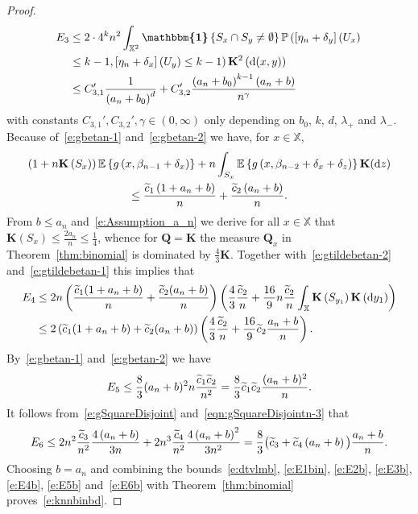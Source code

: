 \documentclass[AHL,Unicode,longabstracts]{cedram}
\newcommand*\bK{\mathbf{K}}
\newcommand{\bQ}{\mathbf{Q}}
\renewcommand*\P{\mathbb{P}}
\newcommand*\X{\mathbb{X}}
\newcommand{\E}{\mathbb{E}}
\newcommand*\md{\mathrm{d}}
\newcommand{\mean}[1] {\E\left\{{#1}\right\}}
\newcommand{\ind}{\boldsymbol{\mathbbm{1}}}
\let\oldtilde\tilde
\renewcommand*{\tilde}[1]{\mathchoice{\widetilde{#1}}{\widetilde{#1}}{\oldtilde{#1}}{\oldtilde{#1}}}
\begin{document}
\begin{proof}
\begin{equation}\label{e:E3b}
\begin{split}
E_3 &\leq 2\cdot 4^k n^2 \int_{\X^2} \ind\left
\{S_{x}\cap S_{y} \neq \emptyset\right\} \P\left(\left[\eta_{n}+\delta_y\right]\left(U_{x}\right)\right. \\
&\left.\leq k-1, \left[\eta_{n}+\delta_x\right]\left(U_{y}\right)\leq k-1\right) \bK^2\left(\md(x,y)\right)\\
&\leq C_{3,1}'\frac{1}{\left(a_n+b_0\right)^d} + C_{3,2}' \frac{\left(a_n+b_0\right)^{k-1}\left(a_n+b\right)}{n^{\gamma}}
\end{split}
\end{equation}
with constants $C_{3,1}',C_{3,2}',\gamma\in(0,\infty)$ only depending on $b_0$, $k$, $d$, $\lambda_+$ and $\lambda_-$. Because of~\eqref{e:gbetan-1} and~\eqref{e:gbetan-2} we have, for $x\in\X$,
\begin{multline*}
\left(1+n\bK\left(S_{x}\right)\right) \mean{g\left(x,\beta_{n-1}+\delta_x\right)} + n \int_{S_{x}} \mean{g\left(x,\beta_{n-2}+\delta_x+\delta_z\right)} \bK(\md z) \\ 
\leq \frac{\tilde{c}_1 \left(1+a_n+ b\right)}{n} + \frac{\tilde{c}_2 \left(a_n + b\right)}{n}.
\end{multline*}
From $b\leq a_n$ and~\eqref{e:Assumption_a_n} we derive for all $x\in\X$ that $\bK(S_x)\leq \tfrac{2a_n}{n}\leq\tfrac{1}{4}$, whence for $\bQ=\bK$ the measure $\bQ_x$ in Theorem~\ref{thm:binomial} is dominated by $\tfrac{4}{3}\bK$. Together with~\eqref{e:gtildebetan-2} and~\eqref{e:gtildebetan-1} this implies that
\begin{equation}\label{e:E4b}
\begin{split}
E_4 & \leq 2n\left(\frac{\tilde{c}_1 (1+a_n+ b)}{n} + \frac{\tilde{c}_2 (a_n + b)}{n} \right) \left(\frac{4}{3} \frac{\tilde{c}_2}{n} + \frac{16}{9} n \frac{\tilde{c}_2}{n} \int_{\X} \bK\left(S_{y_1}\right) \bK\left(\md y_1\right) \right)\\
& \leq 2\left(\tilde{c}_1(1+a_n+ b) + \tilde{c}_2 (a_n + b) \right) \left(\frac{4}{3} \frac{\tilde{c}_2}{n} + \frac{16}{9} \tilde{c}_2 \frac{a_n + b}{n} \right).
\end{split}
\end{equation}
By~\eqref{e:gbetan-1} and~\eqref{e:gbetan-2} we have
\begin{equation}\label{e:E5b}
E_5  \leq \frac{8}{3} (a_n + b)^2 n \frac{\tilde{c}_1\tilde{c}_2}{n^2} = \frac{8}{3} \tilde{c}_1\tilde{c}_2 \frac{(a_n + b)^2}{n}.
\end{equation}
It follows from~\eqref{e:gSquareDisjoint} and~\eqref{eqn:gSquareDisjointn-3} that
\begin{equation}\label{e:E6b}
E_6 \leq 2n^2 \frac{\tilde{c}_3}{n^2} \frac{4\left(a_n + b\right)}{3n} + 2n^3 \frac{\tilde{c}_4}{n^2} \frac{4\left(a_n + b\right)^2}{3n^2} = \frac{8}{3} \big(\tilde{c}_3 + \tilde{c}_4 \left(a_n + b\right) \big) \frac{a_n + b}{n}.
\end{equation}
Choosing $b=a_n$ and combining the bounds~\eqref{e:dtvlmb}, \eqref{e:E1bin}, \eqref{e:E2b}, \eqref{e:E3b}, \eqref{e:E4b}, \eqref{e:E5b} and~\eqref{e:E6b} with Theorem~\ref{thm:binomial} proves~\eqref{e:knnbinbd}.
\end{proof}
\end{document}
